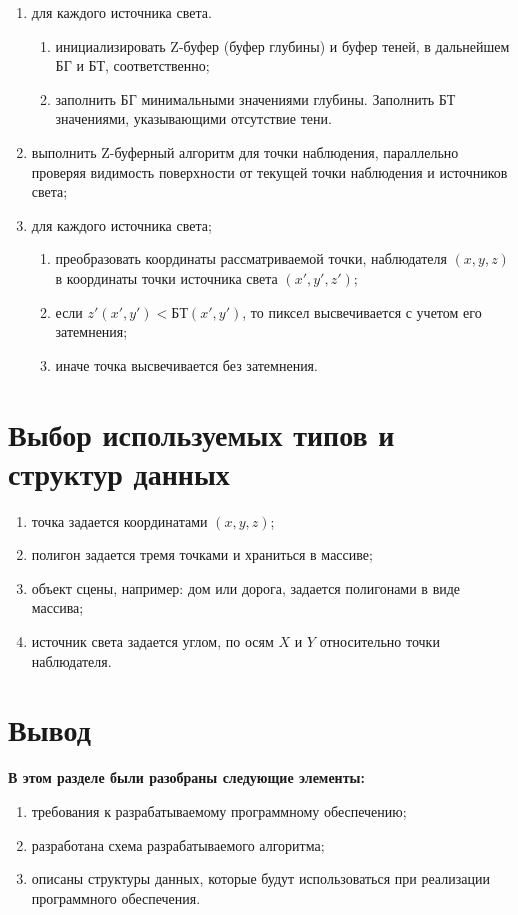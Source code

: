 \begin{enumerate}
	\item для каждого источника света.
	 
	 \begin{enumerate}[label=\arabic{enumi}.\arabic*]
	 	\item инициализировать Z-буфер (буфер глубины)  и буфер теней, в дальнейшем БГ и БТ, соответственно;
	 	\item заполнить БГ минимальными значениями глубины.
	 	Заполнить БТ значениями, указывающими отсутствие тени.
	 \end{enumerate}

	\item выполнить Z-буферный алгоритм для точки наблюдения, параллельно проверяя видимость поверхности от текущей точки наблюдения и источников света;
    \item для каждого источника света;
    
    \begin{enumerate}[label=\arabic{enumi}.\arabic*]
    \item преобразовать координаты рассматриваемой точки, наблюдателя $(x, y, z)$ в координаты точки источника света $(x', y', z')$;
    \item если $z'(x', y') < БТ(x', y')$, то пиксел высвечивается с учетом его затемнения;
    \item  иначе точка высвечивается без затемнения.
   	\end{enumerate}
   
   
\end{enumerate}


\clearpage


\section{Выбор используемых типов и структур данных}


\begin{enumerate}
	\item точка задается координатами $(x, y, z)$;
	\item полигон задается тремя точками и храниться в массиве;
	\item объект сцены, например: дом или дорога, задается полигонами в виде массива;
	\item источник света задается углом, по осям $X$ и $Y$ относительно точки наблюдателя. 
\end{enumerate}


\section{Вывод}
\textbf{В этом разделе были разобраны следующие элементы:}
\begin{enumerate}
\item требования к разрабатываемому программному обеспечению;
\item разработана схема разрабатываемого алгоритма;
\item описаны структуры данных, которые будут использоваться при реализации  программного обеспечения.
\end{enumerate}